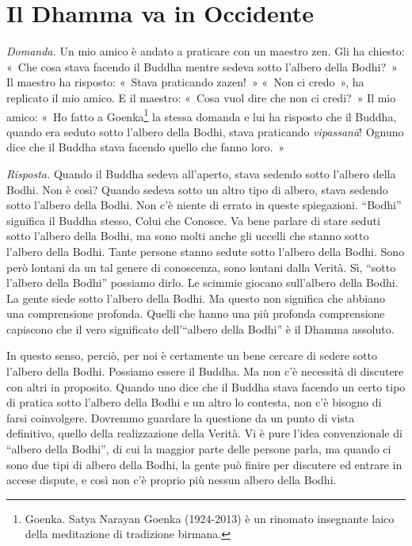 \chapter{Il Dhamma va in Occidente}

\emph{Domanda.} Un mio amico è andato a praticare con un maestro zen. Gli ha
chiesto: «~Che cosa stava facendo il Buddha mentre sedeva sotto l'albero
della Bodhi?~» Il maestro ha risposto: «~Stava praticando zazen!~» «~Non
ci credo~», ha replicato il mio amico. E il maestro: «~Cosa vuol dire
che non ci credi?~» Il mio amico: «~Ho fatto a Goenka\footnote{Goenka.
  Satya Narayan Goenka (1924-2013) è un rinomato insegnante laico della
  meditazione di tradizione birmana.} la stessa domanda e lui ha
risposto che il Buddha, quando era seduto sotto l'albero della Bodhi,
stava praticando \emph{vipassanā}! Ognuno dice che il Buddha stava
facendo quello che fanno loro.~»

\emph{Risposta.} Quando il Buddha sedeva all'aperto, stava sedendo sotto
l'albero della Bodhi. Non è così? Quando sedeva sotto un altro tipo di
albero, stava sedendo sotto l'albero della Bodhi. Non c'è niente di
errato in queste spiegazioni. ``Bodhi'' significa il Buddha stesso,
Colui che Conosce. Va bene parlare di stare seduti sotto l'albero della
Bodhi, ma sono molti anche gli uccelli che stanno sotto l'albero della
Bodhi. Tante persone stanno sedute sotto l'albero della Bodhi. Sono però
lontani da un tal genere di conoscenza, sono lontani dalla Verità. Sì,
``sotto l'albero della Bodhi'' possiamo dirlo. Le scimmie giocano
sull'albero della Bodhi. La gente siede sotto l'albero della Bodhi. Ma
questo non significa che abbiano una comprensione profonda. Quelli che
hanno una più profonda comprensione capiscono che il vero significato
dell'``albero della Bodhi'' è il Dhamma assoluto.

In questo senso, perciò, per noi è certamente un bene cercare di sedere
sotto l'albero della Bodhi. Possiamo essere il Buddha. Ma non c'è
necessità di discutere con altri in proposito. Quando uno dice che il
Buddha stava facendo un certo tipo di pratica sotto l'albero della Bodhi
e un altro lo contesta, non c'è bisogno di farsi coinvolgere. Dovremmo
guardare la questione da un punto di vista definitivo, quello della
realizzazione della Verità. Vi è pure l'idea convenzionale di ``albero
della Bodhi'', di cui la maggior parte delle persone parla, ma quando ci
sono due tipi di albero della Bodhi, la gente può finire per discutere
ed entrare in accese dispute, e così non c'è proprio più nessun albero
della Bodhi.


